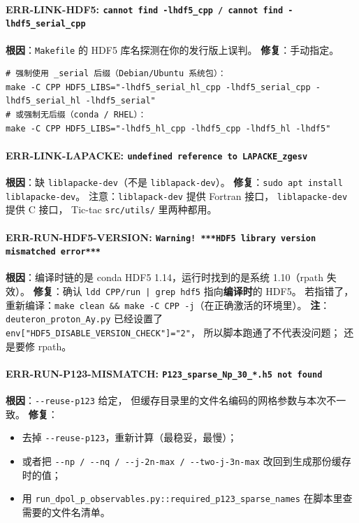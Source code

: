 \paragraph{ERR-LINK-HDF5: \texttt{cannot find -lhdf5\_cpp / cannot find -lhdf5\_serial\_cpp}}
\textbf{根因}：\texttt{Makefile} 的 HDF5 库名探测在你的发行版上误判。
\textbf{修复}：手动指定。
\begin{lstlisting}[style=config]
# 强制使用 _serial 后缀（Debian/Ubuntu 系统包）：
make -C CPP HDF5_LIBS="-lhdf5_serial_hl_cpp -lhdf5_serial_cpp -lhdf5_serial_hl -lhdf5_serial"
# 或强制无后缀（conda / RHEL）：
make -C CPP HDF5_LIBS="-lhdf5_hl_cpp -lhdf5_cpp -lhdf5_hl -lhdf5"
\end{lstlisting}

\paragraph{ERR-LINK-LAPACKE: \texttt{undefined reference to LAPACKE\_zgesv}}
\textbf{根因}：缺 \texttt{liblapacke-dev}（不是 \texttt{liblapack-dev}）。
\textbf{修复}：\texttt{sudo apt install liblapacke-dev}。
注意：\texttt{liblapack-dev} 提供 Fortran 接口，
\texttt{liblapacke-dev} 提供 C 接口，
Tic-tac \texttt{src/utils/} 里两种都用。

\paragraph{ERR-RUN-HDF5-VERSION: \texttt{Warning! ***HDF5 library version mismatched error***}}
\textbf{根因}：编译时链的是 conda HDF5 1.14，运行时找到的是系统 1.10（rpath 失效）。
\textbf{修复}：确认 \texttt{ldd CPP/run | grep hdf5} 指向\textbf{编译时}的 HDF5。
若指错了，重新编译：\texttt{make clean \&\& make -C CPP -j}（在正确激活的环境里）。
\textbf{注}：\texttt{deuteron\_proton\_Ay.py} 已经设置了
\texttt{env["HDF5\_DISABLE\_VERSION\_CHECK"]="2"}，
所以脚本跑通了不代表没问题；
还是要修 rpath。

\paragraph{ERR-RUN-P123-MISMATCH: \texttt{P123\_sparse\_Np\_30\_*.h5 not found}}
\textbf{根因}：\texttt{-{}-reuse-p123} 给定，
但缓存目录里的文件名编码的网格参数与本次不一致。
\textbf{修复}：
\begin{itemize}
  \item 去掉 \texttt{-{}-reuse-p123}，重新计算（最稳妥，最慢）；
  \item 或者把 \texttt{-{}-np / -{}-nq / -{}-j-2n-max / -{}-two-j-3n-max}
        改回到生成那份缓存时的值；
  \item 用 \texttt{run\_dpol\_p\_observables.py::required\_p123\_sparse\_names}
        在脚本里查需要的文件名清单。
\end{itemize}

